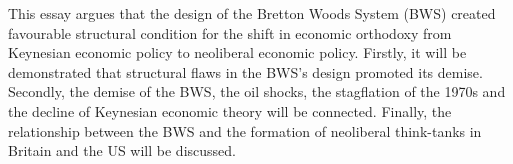 \documentclass[11pt]{article}
\begin{document}
This essay argues that the design of the Bretton Woods System (BWS) created favourable structural condition for the shift in economic orthodoxy from Keynesian economic policy to neoliberal economic policy. Firstly, it will be demonstrated that structural flaws in the BWS's design promoted its demise. Secondly, the demise of the BWS, the oil shocks, the stagflation of the 1970s and the decline of Keynesian economic theory will be connected.
Finally, the relationship between the BWS and the formation of neoliberal think-tanks in Britain and the US will be discussed.
 \\



\end{document}
